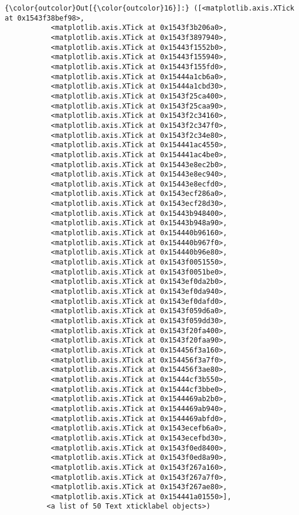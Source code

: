 \documentclass[11pt]{article}
\begin{document}
\begin{Verbatim}[commandchars=\\\{\}]
{\color{outcolor}Out[{\color{outcolor}16}]:} ([<matplotlib.axis.XTick at 0x1543f38bef98>,
           <matplotlib.axis.XTick at 0x1543f3b206a0>,
           <matplotlib.axis.XTick at 0x1543f3897940>,
           <matplotlib.axis.XTick at 0x15443f1552b0>,
           <matplotlib.axis.XTick at 0x15443f155940>,
           <matplotlib.axis.XTick at 0x15443f155fd0>,
           <matplotlib.axis.XTick at 0x15444a1cb6a0>,
           <matplotlib.axis.XTick at 0x15444a1cbd30>,
           <matplotlib.axis.XTick at 0x1543f25ca400>,
           <matplotlib.axis.XTick at 0x1543f25caa90>,
           <matplotlib.axis.XTick at 0x1543f2c34160>,
           <matplotlib.axis.XTick at 0x1543f2c347f0>,
           <matplotlib.axis.XTick at 0x1543f2c34e80>,
           <matplotlib.axis.XTick at 0x154441ac4550>,
           <matplotlib.axis.XTick at 0x154441ac4be0>,
           <matplotlib.axis.XTick at 0x15443e8ec2b0>,
           <matplotlib.axis.XTick at 0x15443e8ec940>,
           <matplotlib.axis.XTick at 0x15443e8ecfd0>,
           <matplotlib.axis.XTick at 0x1543ecf286a0>,
           <matplotlib.axis.XTick at 0x1543ecf28d30>,
           <matplotlib.axis.XTick at 0x15443b948400>,
           <matplotlib.axis.XTick at 0x15443b948a90>,
           <matplotlib.axis.XTick at 0x154440b96160>,
           <matplotlib.axis.XTick at 0x154440b967f0>,
           <matplotlib.axis.XTick at 0x154440b96e80>,
           <matplotlib.axis.XTick at 0x1543f0051550>,
           <matplotlib.axis.XTick at 0x1543f0051be0>,
           <matplotlib.axis.XTick at 0x1543ef0da2b0>,
           <matplotlib.axis.XTick at 0x1543ef0da940>,
           <matplotlib.axis.XTick at 0x1543ef0dafd0>,
           <matplotlib.axis.XTick at 0x1543f059d6a0>,
           <matplotlib.axis.XTick at 0x1543f059dd30>,
           <matplotlib.axis.XTick at 0x1543f20fa400>,
           <matplotlib.axis.XTick at 0x1543f20faa90>,
           <matplotlib.axis.XTick at 0x154456f3a160>,
           <matplotlib.axis.XTick at 0x154456f3a7f0>,
           <matplotlib.axis.XTick at 0x154456f3ae80>,
           <matplotlib.axis.XTick at 0x15444cf3b550>,
           <matplotlib.axis.XTick at 0x15444cf3bbe0>,
           <matplotlib.axis.XTick at 0x1544469ab2b0>,
           <matplotlib.axis.XTick at 0x1544469ab940>,
           <matplotlib.axis.XTick at 0x1544469abfd0>,
           <matplotlib.axis.XTick at 0x1543ecefb6a0>,
           <matplotlib.axis.XTick at 0x1543ecefbd30>,
           <matplotlib.axis.XTick at 0x1543f0ed8400>,
           <matplotlib.axis.XTick at 0x1543f0ed8a90>,
           <matplotlib.axis.XTick at 0x1543f267a160>,
           <matplotlib.axis.XTick at 0x1543f267a7f0>,
           <matplotlib.axis.XTick at 0x1543f267ae80>,
           <matplotlib.axis.XTick at 0x154441a01550>],
          <a list of 50 Text xticklabel objects>)
\end{Verbatim}
            
\end{document}
